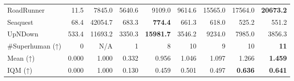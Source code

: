\begin{table*}[h]
\begin{center}
\begin{small}
{\begin{tabular}{lrr rrrrrr}
RoadRunner           &  11.5      &  7845.0    &  5640.6    &  9109.0             &  9614.6            &  15565.0            &  17564.0            &  \textbf{20673.2}         \\
Seaquest             &  68.4      &  42054.7   &  683.3     &  \textbf{774.4}     &  661.3             &  618.0              &  525.2              &  551.2                    \\
UpNDown              &  533.4     &  11693.2   &  3350.3    &  \textbf{15981.7}   &  3546.2            &  9234.0             &  7985.0             &  3856.3                   \\
\midrule
\#Superhuman (↑)     &  0         &  N/A       &  1         &  8                  &  10                &  9                  &  10                 &  \textbf{11}              \\
Mean (↑)             &  0.000     &  1.000     &  0.332     &  0.956              &  1.046             &  1.097              &  1.266              &  \textbf{1.459}           \\
IQM (↑)              &  0.000     &  1.000     &  0.130     &  0.459              &  0.501             &  0.497              &  \textbf{0.636}     &  \textbf{0.641}           \\

\bottomrule
\end{tabular}
 }
\end{small}
\end{center}
\vspace{-7mm}
\end{table*}